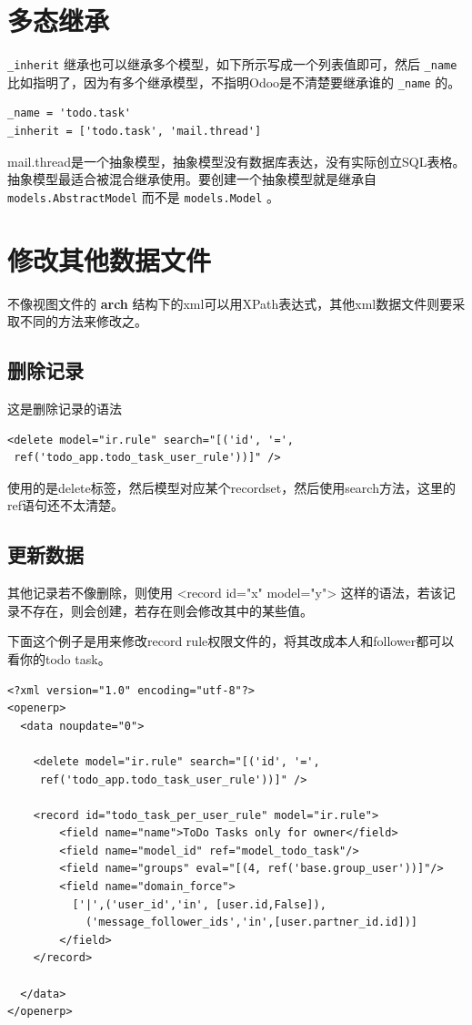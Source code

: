 \documentclass[11pt,a4paper]{sphinxmanual}
\begin{document}
\section{多态继承}
\label{sec-8-5}
\verb~_inherit~ 继承也可以继承多个模型，如下所示写成一个列表值即可，然后 \verb~_name~ 比如指明了，因为有多个继承模型，不指明Odoo是不清楚要继承谁的 \verb~_name~ 的。

\begin{Verbatim}
_name = 'todo.task'
_inherit = ['todo.task', 'mail.thread']
\end{Verbatim}

mail.thread是一个抽象模型，抽象模型没有数据库表达，没有实际创立SQL表格。抽象模型最适合被混合继承使用。要创建一个抽象模型就是继承自 \verb~models.AbstractModel~ 而不是 \verb~models.Model~ 。



\section{修改其他数据文件}
\label{sec-8-6}
不像视图文件的 \textbf{arch} 结构下的xml可以用XPath表达式，其他xml数据文件则要采取不同的方法来修改之。

\subsection{删除记录}
\label{sec-8-6-1}
这是删除记录的语法
\begin{Verbatim}
<delete model="ir.rule" search="[('id', '=',
 ref('todo_app.todo_task_user_rule'))]" />
\end{Verbatim}

使用的是delete标签，然后模型对应某个recordset，然后使用search方法，这里的ref语句还不太清楚。

\subsection{更新数据}
\label{sec-8-6-2}
其他记录若不像删除，则使用 <record id="x" model="y"> 这样的语法，若该记录不存在，则会创建，若存在则会修改其中的某些值。

下面这个例子是用来修改record rule权限文件的，将其改成本人和follower都可以看你的todo task。

\begin{verbatim}
<?xml version="1.0" encoding="utf-8"?>
<openerp>
  <data noupdate="0">

    <delete model="ir.rule" search="[('id', '=',
     ref('todo_app.todo_task_user_rule'))]" />

    <record id="todo_task_per_user_rule" model="ir.rule">
        <field name="name">ToDo Tasks only for owner</field>
        <field name="model_id" ref="model_todo_task"/>
        <field name="groups" eval="[(4, ref('base.group_user'))]"/>
        <field name="domain_force">
          ['|',('user_id','in', [user.id,False]),
            ('message_follower_ids','in',[user.partner_id.id])]
        </field>
    </record>

  </data>
</openerp>
\end{verbatim}
\end{document}
